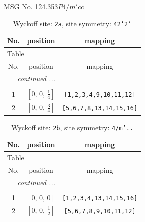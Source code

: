 \documentclass[fleqn,8pt]{jsarticle}
\begin{document}
\setcounter{MaxMatrixCols}{32}

\renewcommand{\tablename}{Table~}
\renewcommand{\figurename}{Figure~}
\begin{center}
\LARGE
MSG No. 124.353\quad$P4/m'cc$
\end{center}
\renewcommand{\arraystretch}{1.2}
\begin{longtable}{ccc}
\caption{Wyckoff site: {\tt 2a}, site symmetry: {\tt 42'2'}}
 \\
 \hline \hline
No. & position & mapping \\ \hline \endfirsthead

\multicolumn{2}{l}{\tablename\ \thetable{}} \\
 \hline \hline
No. & position & mapping \\ \hline \endhead

 \hline \hline
\multicolumn{2}{r}{\footnotesize\it continued ...} \\ \endfoot

 \hline \hline
\multicolumn{2}{r}{} \\ \endlastfoot

1 & $\left[ 0,\, 0,\, \frac{1}{4} \right]$ & {\tt [1,2,3,4,9,10,11,12]} \\ \hline
2 & $\left[ 0,\, 0,\, \frac{3}{4} \right]$ & {\tt [5,6,7,8,13,14,15,16]} \\
\end{longtable}
\renewcommand{\arraystretch}{1.2}
\begin{longtable}{ccc}
\caption{Wyckoff site: {\tt 2b}, site symmetry: {\tt 4/m'..}}
 \\
 \hline \hline
No. & position & mapping \\ \hline \endfirsthead

\multicolumn{2}{l}{\tablename\ \thetable{}} \\
 \hline \hline
No. & position & mapping \\ \hline \endhead

 \hline \hline
\multicolumn{2}{r}{\footnotesize\it continued ...} \\ \endfoot

 \hline \hline
\multicolumn{2}{r}{} \\ \endlastfoot

1 & $\left[ 0,\, 0,\, 0 \right]$ & {\tt [1,2,3,4,13,14,15,16]} \\ \hline
2 & $\left[ 0,\, 0,\, \frac{1}{2} \right]$ & {\tt [5,6,7,8,9,10,11,12]} \\
\end{longtable}
\end{document}
